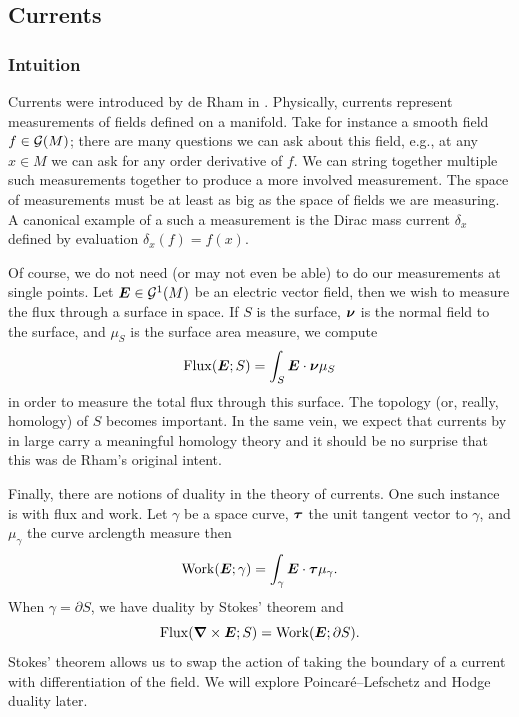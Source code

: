 \documentclass{article}
\begin{document}
\subsection{Currents}
\label{sec:fields_and_currents}
\subsubsection{Intuition}
Currents were introduced by de Rham in . Physically, currents represent measurements of fields defined on a manifold. Take for instance a smooth field $f\in \mathcal{G}(M)$; there are many questions we can ask about this field, e.g., at any $x\in M$ we can ask for any order derivative of $f$. We can string together multiple such measurements together to produce a more involved measurement. The space of measurements must be at least as big as the space of fields we are measuring.  A canonical example of a such a measurement is the Dirac mass current $\delta_x$ defined by evaluation $\delta_x(f)=f(x)$.

Of course, we do not need (or may not even be able) to do our measurements at single points. Let $\boldsymbol{E}\in \mathcal{G}^1(M)$ be an electric vector field, then we wish to measure the flux through a surface in space. If $S$ is the surface, $\boldsymbol{\nu}$ is the normal field to the surface, and $\mu_S$ is the surface area measure, we compute
\begin{equation}
\label{eq:flux_motivation}
    \mathrm{Flux}(\boldsymbol{E};S) = \int_S \boldsymbol{E}\cdot \boldsymbol{\nu} \mu_S
\end{equation}
in order to measure the total flux through this surface. The topology (or, really, homology) of $S$ becomes important. In the same vein, we expect that currents by in large carry a meaningful homology theory and it should be no surprise that this was de Rham's original intent. 

Finally, there are notions of duality in the theory of currents. One such instance is with flux and work. Let $\gamma$ be a space curve, $\boldsymbol{\tau}$ the unit tangent vector to $\gamma$, and $\mu_\gamma$ the curve arclength measure then
\begin{equation}
\label{eq:work_motivation}
    \mathrm{Work}(\boldsymbol{E};\gamma) = \int_\gamma \boldsymbol{E}\cdot \boldsymbol{\tau} \mu_\gamma.
\end{equation}
When $\gamma=\partial S$, we have duality by Stokes' theorem and
\[
\mathrm{Flux}(\boldsymbol{\nabla} \times \boldsymbol{E};S)=\mathrm{Work}(\boldsymbol{E};\partial S).
\]
Stokes' theorem allows us to swap the action of taking the boundary of a current with differentiation of the field. We will explore Poincar\'e--Lefschetz and Hodge duality later.
\end{document}
